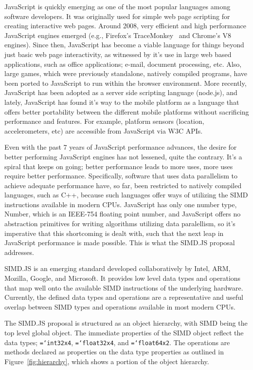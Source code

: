\documentclass[preprint]{sigplanconf}
\newcommand{\ttt}[1]{{\texttt{\hyphenchar\font=`\-\relax #1}}}%
\begin{document}
JavaScript is quickly emerging as one of the most popular languages among 
software developers.  It was originally used for simple web page scripting for 
creating interactive web pages. Around 2008, very efficient and high 
performance JavaScript engines emerged (e.g., Firefox's TraceMonkey~\cite{tracemonkey} and 
Chrome's V8 engines). Since then, JavaScript has become a viable language for 
things beyond just basic web page interactivity, as witnessed by it's use in 
large web based applications, such as office applications; e-mail, document 
processing, etc. Also, large games, which were previously standalone, natively
compiled programs, have been ported to JavaScript to run within the browser 
environment.  More recently, JavaScript has been adopted as a server side 
scripting language (node.js), and lately, JavaScript has found it's way to the
mobile platform as a language that offers better portability between the 
different mobile platforms without sacrificing performance and features.  For 
example, platform sensors (location, accelerometers, etc) are 
accessible from JavaScript via W3C APIs.

Even with the past 7 years of JavaScript performance advances, the desire for 
better performing JavaScript engines has not lessened, quite the contrary. It's
a spiral that keeps on going; better performance leads to more uses, more uses 
require better performance.  Specifically, software that uses data parallelism 
to achieve adequate performance have, so far, been restricted to natively 
compiled languages, such as C++, because such languages offer ways of utilizing 
the SIMD instructions available in modern CPUs.  JavaScript has only one number
type, Number, which is an IEEE-754 floating point number, and JavaScript offers 
no abstraction primitives for writing algorithms utilizing data paralellism, so 
it's imperative that this shortcoming is dealt with, such that the next leap
in JavaScript performance is made possible.  This is what the SIMD.JS proposal
addresses.

SIMD.JS is an emerging standard developed collaboratively by Intel, ARM,
Mozilla, Google, and Microsoft.  It provides low level data types and 
operations that map well onto the available SIMD instructions of the underlying 
hardware.  Currently, the defined data types and operations are a 
representative and useful overlap between SIMD types and operations available 
in most modern CPUs.

The SIMD.JS proposal is structured as an object hierarchy, with SIMD being the
top level global object.  The immediate properties of the SIMD object reflect
the data types; \ttt{int32x4}, \ttt{float32x4}, and \ttt{float64x2}.  The 
operations are methods declared as properties on the data type properties as 
outlined in  Figure~\ref{fig:hierarchy}, which shows a portion of the object 
hierarchy.
\end{document}
